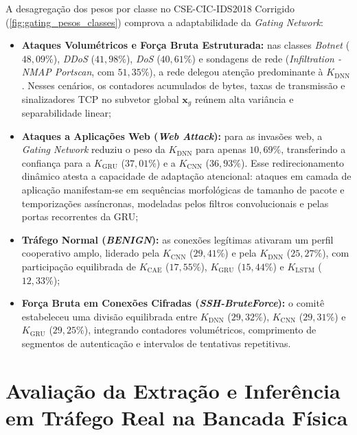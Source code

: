 A desagregação dos pesos por classe no CSE-CIC-IDS2018 Corrigido (\ref{fig:gating_pesos_classes})
comprova a adaptabilidade da \emph{Gating Network}:
\begin{itemize}
    \item \textbf{Ataques Volumétricos e Força Bruta Estruturada:} nas classes \emph{Botnet}
    ($48{,}09\%$), \emph{DDoS} ($41{,}98\%$), \emph{DoS} ($40{,}61\%$) e sondagens de rede
    (\emph{Infiltration - NMAP Portscan}, com $51{,}35\%$), a rede delegou atenção predominante à
    $K_{\mathrm{DNN}}$. Nesses cenários, os contadores acumulados de bytes, taxas de
    transmissão e sinalizadores TCP no subvetor global $\mathbf{x}_g$ reúnem alta variância e separabilidade
    linear;
    
    \item \textbf{Ataques a Aplicações Web (\emph{Web Attack}):} para as invasões web, a
    \emph{Gating Network} reduziu o peso da $K_{\mathrm{DNN}}$ para apenas $10{,}69\%$,
    transferindo a confiança para a $K_{\mathrm{GRU}}$ ($37{,}01\%$) e a
    $K_{\mathrm{CNN}}$ ($36{,}93\%$). Esse redirecionamento dinâmico atesta a capacidade de
    adaptação atencional: ataques em camada de aplicação manifestam-se em sequências morfológicas de
    tamanho de pacote e temporizações assíncronas, modeladas pelos filtros convolucionais e pelas portas
    recorrentes da GRU;
    
    \item \textbf{Tráfego Normal (\emph{BENIGN}):} as conexões legítimas ativaram um perfil cooperativo
    amplo, liderado pela $K_{\mathrm{CNN}}$ ($29{,}41\%$) e pela $K_{\mathrm{DNN}}$
    ($25{,}27\%$), com participação equilibrada de $K_{\mathrm{CAE}}$ ($17{,}55\%$),
    $K_{\mathrm{GRU}}$ ($15{,}44\%$) e $K_{\mathrm{LSTM}}$ ($12{,}33\%$);
    
    \item \textbf{Força Bruta em Conexões Cifradas (\emph{SSH-BruteForce}):} o comitê estabeleceu uma
    divisão equilibrada entre $K_{\mathrm{DNN}}$ ($29{,}32\%$), $K_{\mathrm{CNN}}$
    ($29{,}31\%$) e $K_{\mathrm{GRU}}$ ($29{,}25\%$), integrando contadores volumétricos,
    comprimento de segmentos de autenticação e intervalos de tentativas repetitivas.
\end{itemize}

\section{Avaliação da Extração e Inferência em Tráfego Real na Bancada Física}
\label{sec:avaliacao_extracao_inferencia}

